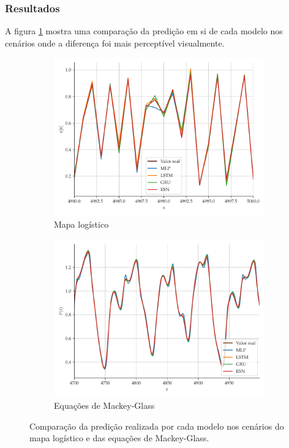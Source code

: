 \documentclass{beamer}
\begin{document}
\begin{frame}
\frametitle{Resultados}
\justifying A figura \ref{fig:series-comparison} mostra uma comparação da predição em si de cada modelo nos cenários onde a diferença foi mais perceptível visualmente.

\begin{figure}[!ht]
     \begin{subfigure}[t]{0.4\textwidth} 
     \centering
         \includegraphics[scale=0.24]{vs-logistic-zoom.pdf}
         \caption{Mapa logístico}
     \end{subfigure}
     \centering
     \begin{subfigure}[t]{0.4\textwidth}
     \centering
         \includegraphics[scale=0.24]{vs-mackeyglass-zoom.pdf}
         \caption{Equações de Mackey-Glass}
     \end{subfigure}
     \centering     
     \caption{Comparação da predição realizada por cada modelo nos cenários do mapa logístico e das equações de Mackey-Glass.}
     \label{fig:series-comparison}
\end{figure}
\end{frame}
\end{document}
